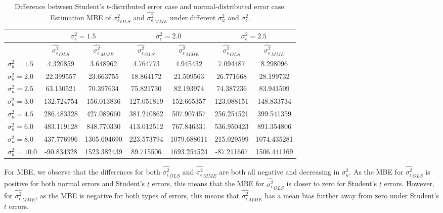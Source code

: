 \documentclass{article}
\begin{document}
\begin{table}[ht]
    \centering
    \caption{Difference between Student's $t$-distributed error case and normal-distributed error case: Estimation MBE of $\hat{\sigma^2_\epsilon}_{OLS}$ and $\hat{\sigma^2_\epsilon}_{MME}$ under different $\sigma^2_u$ and $\sigma^2_\epsilon$.}
    \label{Tab:MSE_sigma_diff_t}
    \begin{tabular}[t]{lcccccc}
        \hline
        &\multicolumn{2}{c}{$\sigma^2_\epsilon=1.5$}&\multicolumn{2}{c}{$\sigma^2_\epsilon=2.0$}&\multicolumn{2}{c}{$\sigma^2_\epsilon=2.5$}\\
        \hline
        &$\hat{\sigma^2_\epsilon}_{OLS}$&$\hat{\sigma^2_\epsilon}_{MME}$&$\hat{\sigma^2_\epsilon}_{OLS}$&
        $\hat{\sigma^2_\epsilon}_{MME}$&$\hat{\sigma^2_\epsilon}_{OLS}$&$\hat{\sigma^2_\epsilon}_{MME}$\\
        \hline
        $\sigma^2_u = 1.5$&4.320859&3.648962&4.764773&4.945432&7.094487&8.298096\\
        $\sigma^2_u = 2.0$&22.399557&23.663755&18.864172&21.509563&26.771668&28.199732\\
        $\sigma^2_u = 2.5$&63.130521&70.397634&75.821730&82.193974&74.387236&83.941509\\
        $\sigma^2_u = 3.0$&132.724754&156.013836&127.051819&152.665357&123.088151&148.833734\\
        $\sigma^2_u = 4.5$&286.483328&427.089660&381.240862&507.907457&256.254521&399.541359\\
        $\sigma^2_u = 6.0$&483.119128&848.770330&413.012512&767.846331&536.950423&891.354806\\
        $\sigma^2_u = 8.0$&437.776996&1305.694690&223.573794&1079.688011&215.029599&1074.435281\\
        $\sigma^2_u = 10.0$&-90.834328&1523.382439&89.715506&1693.254524&-87.211667&1506.441169\\
        \hline
    \end{tabular}
\end{table}

For MBE, we observe that the differences for both $\hat{\sigma^2_\epsilon}_{OLS}$ and $\hat{\sigma^2_\epsilon}_{MME}$ are both all negative and decreasing in $\sigma^2_u$.
As the MBE for $\hat{\sigma^2_\epsilon}_{OLS}$ is positive for both normal errors and Student's $t$ errors, this means that the MBE for $\hat{\sigma^2_\epsilon}_{OLS}$ is closer to zero for Student's $t$ errors.
However, for $\hat{\sigma^2_\epsilon}_{MME}$, as the MBE is negative for both types of errors, this means that $\hat{\sigma^2_\epsilon}_{MME}$ has a mean bias further away from zero under Student's $t$ errors.
\end{document}

